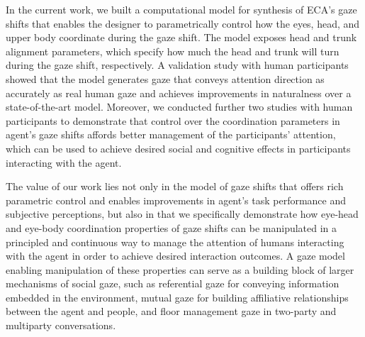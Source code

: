In the current work, we built a computational model for synthesis of ECA's gaze shifts that enables the designer to parametrically control how the eyes, head, and upper body coordinate during the gaze shift. The model exposes head and trunk alignment parameters, which specify how much the head and trunk will turn during the gaze shift, respectively. A validation study with human participants showed that the model generates gaze that conveys attention direction as accurately as real human gaze and achieves improvements in naturalness over a state-of-the-art model. Moreover, we conducted further two studies with human participants to demonstrate that control over the coordination parameters in agent's gaze shifts affords better management of the participants' attention, which can be used to achieve desired social and cognitive effects in participants interacting with the agent.

The value of our work lies not only in the model of gaze shifts that offers rich parametric control and enables improvements in agent's task performance and subjective perceptions, but also in that we specifically demonstrate how eye-head and eye-body coordination properties of gaze shifts can be manipulated in a principled and continuous way to manage the attention of humans interacting with the agent in order to achieve desired interaction outcomes. A gaze model enabling manipulation of these properties can serve as a building block of larger mechanisms of social gaze, such as referential gaze for conveying information embedded in the environment, mutual gaze for building affiliative relationships between the agent and people, and floor management gaze in two-party and multiparty conversations.